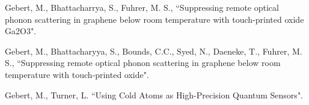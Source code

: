 \documentclass[10pt,a4paper,ragged2e,withhyper]{altacv}
\begin{document}
        
        
        
        Gebert, M., Bhattacharrya, S., Fuhrer, M. S., ``Suppressing remote optical phonon scattering in graphene below room temperature with touch-printed oxide Ga2O3".
        
        \divider
        
        Gebert, M., Bhattacharyya, S., Bounds, C.C., Syed, N., Daeneke, T., Fuhrer, M. S.,
        ``Suppressing remote optical phonon scattering in graphene below room temperature with touch‐printed oxide".
        
        \divider
        
        Gebert, M., Turner, L.
		``Using Cold Atoms as High-Precision Quantum Sensors".
		        
\end{document}
